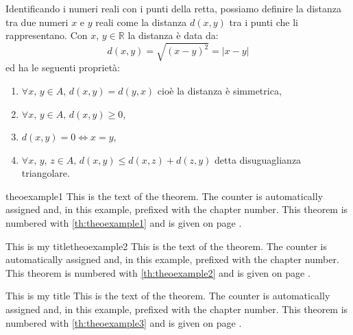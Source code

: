 Identificando i numeri reali con i punti della retta, possiamo definire la 
distanza tra due numeri \(x\) e \(y\) reali come la distanza \(d(x, y)\) tra 
i punti che li rappresentano. Con \(x\), \(y\in\mathbb{R}\) la distanza è 
data da:
\begin{equation}
  d(x,y)=\sqrt{(x-y)^2}=\vert x-y\vert
\end{equation}
ed ha le seguenti proprietà:
\begin{enumerate}
  \item \(\forall x,\,y \in A,\,d(x,y)=d(y,x)\) cioè la distanza è 
simmetrica,
  \item \(\forall x,\,y \in A,\,d(x,y)\geq0\),
  \item \(d(x,y)=0\Leftrightarrow x=y\),
  \item \(\forall x,\,y,\,z \in A,\,d(x,y)\leq d(x,z)+d(z,y)\) detta 
disuguaglianza triangolare.
\end{enumerate}

% 

\begin{newtheo}{}{theoexample1}
This is the text of the theorem. The counter is automatically assigned and,
in this example, prefixed with the chapter number. This theorem is numbered 
with \ref{th:theoexample1} and is given on page \pageref{th:theoexample1}.
\end{newtheo}

\noindent
\begin{minipage}{.48\textwidth}
\begin{newtheo}{This is my title}{theoexample2}
This is the text of the theorem. The counter is automatically assigned and,
in this example, prefixed with the chapter number. This theorem is numbered 
with \ref{th:theoexample2} and is given on page \pageref{th:theoexample2}.
\end{newtheo}
\end{minipage}
\hfill
\begin{minipage}{.48\textwidth}
\begin{newtheo}{This is my title}
This is the text of the theorem. The counter is automatically assigned and,
in this example, prefixed with the chapter number. This theorem is numbered 
with \ref{th:theoexample3} and is given on page \pageref{th:theoexample3}.
\end{newtheo}
\label{th:theoexample3}
\end{minipage}

